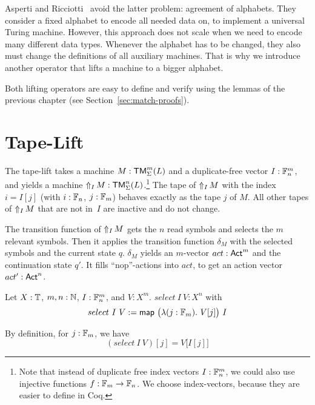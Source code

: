 Asperti and Ricciotti~\cite{asperti2015} avoid the latter problem: agreement of alphabets.  They consider a fixed alphabet to encode all needed data
on, to implement a universal Turing machine.  However, this approach does not scale when we need to encode many different data types.  Whenever the
alphabet has to be changed, they also must change the definitions of all auxiliary machines.  That is why we introduce another operator that lifts a
machine to a bigger alphabet.

Both lifting operators are easy to define and verify using the lemmas of the previous chapter (see Section~\ref{sec:match-proofs}).


\section{Tape-Lift}
\label{sec:n-Lift}
%

The tape-lift takes a machine $M:\TM_\Sigma^m(L)$ and a duplicate-free vector $I: \Fin_n^m$, and yields a machine
$\LiftTapes{M}{I} : \TM_\Sigma^n(L)$.\footnote{ Note that instead of duplicate free index vectors $I:\Fin_n^m$, we could also use injective functions
  $f: \Fin_m \to \Fin_n$.  We choose index-vectors, because they are easier to define in Coq.}  The tape of $\LiftTapes{M}{I}$ with the index
$i = I[j]$ (with $i:\Fin_n$, $j:\Fin_m$) behaves exactly as the tape $j$ of $M$.  All other tapes of $\LiftTapes{M}{I}$ that are not in~$I$ are
inactive and do not change.


The transition function of $\LiftTapes{M}{I}$ gets the $n$ read symbols and selects the $m$ relevant symbols.  Then it applies the transition function
$\delta_M$ with the selected symbols and the current state $q$.  $\delta_M$ yields an $m$-vector $act:\Act^m$ and the continuation state $q'$.  It
fills ``nop''-actions into $act$, to get an action vector $act':\Act^n$.

\begin{definition}
  \label{def:select}
  Let $X:\Type$, $m,n:\Nat$, $I : \Fin_n^m$, and $V : X^m$.  $select~I~V : X^n$ with
  \[ select~I~V := \map{\bigl(\lambda (j:\Fin_m).~V[j] \bigr)}{I} \]
\end{definition}
\begin{lemma}
  By definition, for $j:\Fin_m$, we have
  \[
    (select~I~V)[j]=V\bigl[I[j]\bigr]
  \]
\end{lemma}

